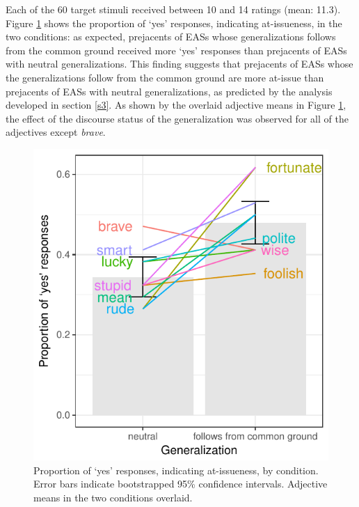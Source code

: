 \documentclass[11pt,fleqn]{article}
\newcommand{\6}{\mbox{$[\hspace*{-.6mm}[$}}
\newcommand{\9}{\mbox{$]\hspace*{-.6mm}]$}}
\begin{document}
Each of the 60 target stimuli received between 10 and 14 ratings (mean: 11.3).  Figure \ref{f-ai-by-adj} shows the proportion of `yes' responses, indicating at-issueness, in the two conditions:  as expected, prejacents of EASs whose generalizations follows from the common ground  received more `yes' responses than prejacents of EASs with neutral generalizations. This finding suggests that prejacents of EASs whose the generalizations follow from the common ground are more at-issue than prejacents of EASs with neutral generalizations, as predicted by the analysis developed in section \ref{s3}. As shown by the overlaid adjective means in Figure \ref{f-ai-by-adj}, the effect of the discourse status of the generalization was observed for all of the adjectives except {\em brave}.

\begin{figure}[H]
\begin{center}
\includegraphics[scale=.85]{../exp3-at-issueness/graphs/proportion-ai-by-condition}

\caption{Proportion of `yes' responses, indicating at-issueness, by condition. Error bars indicate bootstrapped 95\% confidence intervals. Adjective means in the two conditions overlaid.}\label{f-ai-by-adj}
\end{center}
\end{figure}
\end{document}
